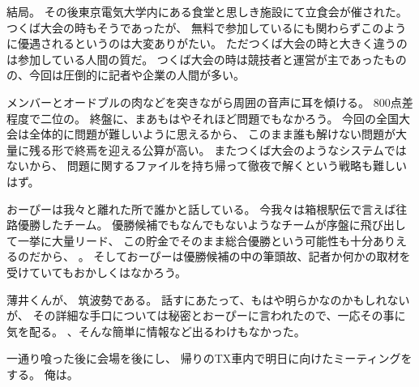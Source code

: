 結局。
その後東京電気大学内にある食堂と思しき施設にて立食会が催された。
つくば大会の時もそうであったが、
無料で参加しているにも関わらずこのように優遇されるというのは大変ありがたい。
ただつくば大会の時と大きく違うのは参加している人間の質だ。
つくば大会の時は競技者と運営が主であったものの、今回は圧倒的に記者や企業の人間が多い。

メンバーとオードブルの肉などを突きながら周囲の音声に耳を傾ける。
800点差程度で二位の。
終盤に、まあもはやそれほど問題でもなかろう。
今回の全国大会は全体的に問題が難しいように思えるから、
このまま誰も解けない問題が大量に残る形で終焉を迎える公算が高い。
またつくば大会のようなシステムではないから、
問題に関するファイルを持ち帰って徹夜で解くという戦略も難しいはず。

おーぴーは我々と離れた所で誰かと話している。
今我々は箱根駅伝で言えば往路優勝したチーム。
優勝候補でもなんでもないようなチームが序盤に飛び出して一挙に大量リード、
この貯金でそのまま総合優勝という可能性も十分ありえるのだから、
。
そしておーぴーは優勝候補の中の筆頭故、記者か何かの取材を受けていてもおかしくはなかろう。

薄井くんが、
筑波勢である。%
話すにあたって、もはや明らかなのかもしれないが、
その詳細な手口については秘密とおーぴーに言われたので、一応その事に気を配る。
、そんな簡単に情報など出るわけもなかった。

一通り喰った後に会場を後にし、
帰りのTX車内で明日に向けたミーティングをする。
俺は。
